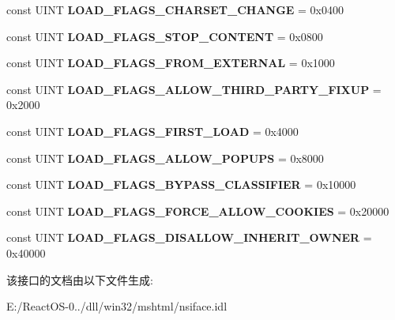 \begin{DoxyCompactItemize}
\item 
\mbox{\label{interfacens_i_web_navigation_abfb617c83b36cba556da0ed4e7e55145}} 
const U\+I\+NT {\bfseries L\+O\+A\+D\+\_\+\+F\+L\+A\+G\+S\+\_\+\+C\+H\+A\+R\+S\+E\+T\+\_\+\+C\+H\+A\+N\+GE} = 0x0400
\item 
\mbox{\label{interfacens_i_web_navigation_ab5475f69d242f1e0cf9540234a593072}} 
const U\+I\+NT {\bfseries L\+O\+A\+D\+\_\+\+F\+L\+A\+G\+S\+\_\+\+S\+T\+O\+P\+\_\+\+C\+O\+N\+T\+E\+NT} = 0x0800
\item 
\mbox{\label{interfacens_i_web_navigation_a9f9f064ebf3011fab6fd9fe8879386f6}} 
const U\+I\+NT {\bfseries L\+O\+A\+D\+\_\+\+F\+L\+A\+G\+S\+\_\+\+F\+R\+O\+M\+\_\+\+E\+X\+T\+E\+R\+N\+AL} = 0x1000
\item 
\mbox{\label{interfacens_i_web_navigation_a80cb7792f09cd9d40633d31f64d7ef5e}} 
const U\+I\+NT {\bfseries L\+O\+A\+D\+\_\+\+F\+L\+A\+G\+S\+\_\+\+A\+L\+L\+O\+W\+\_\+\+T\+H\+I\+R\+D\+\_\+\+P\+A\+R\+T\+Y\+\_\+\+F\+I\+X\+UP} = 0x2000
\item 
\mbox{\label{interfacens_i_web_navigation_a35d7cedd837a632adc4be44a3666a06a}} 
const U\+I\+NT {\bfseries L\+O\+A\+D\+\_\+\+F\+L\+A\+G\+S\+\_\+\+F\+I\+R\+S\+T\+\_\+\+L\+O\+AD} = 0x4000
\item 
\mbox{\label{interfacens_i_web_navigation_a6f89b841601276fe8bca84d3676fdc9f}} 
const U\+I\+NT {\bfseries L\+O\+A\+D\+\_\+\+F\+L\+A\+G\+S\+\_\+\+A\+L\+L\+O\+W\+\_\+\+P\+O\+P\+U\+PS} = 0x8000
\item 
\mbox{\label{interfacens_i_web_navigation_a85e77bb66caadea05878024824f9a371}} 
const U\+I\+NT {\bfseries L\+O\+A\+D\+\_\+\+F\+L\+A\+G\+S\+\_\+\+B\+Y\+P\+A\+S\+S\+\_\+\+C\+L\+A\+S\+S\+I\+F\+I\+ER} = 0x10000
\item 
\mbox{\label{interfacens_i_web_navigation_adfb36b5f377f9a2186fbc223ad7df9a9}} 
const U\+I\+NT {\bfseries L\+O\+A\+D\+\_\+\+F\+L\+A\+G\+S\+\_\+\+F\+O\+R\+C\+E\+\_\+\+A\+L\+L\+O\+W\+\_\+\+C\+O\+O\+K\+I\+ES} = 0x20000
\item 
\mbox{\label{interfacens_i_web_navigation_acee3039728efec79baedbc6eb2557090}} 
const U\+I\+NT {\bfseries L\+O\+A\+D\+\_\+\+F\+L\+A\+G\+S\+\_\+\+D\+I\+S\+A\+L\+L\+O\+W\+\_\+\+I\+N\+H\+E\+R\+I\+T\+\_\+\+O\+W\+N\+ER} = 0x40000
\end{DoxyCompactItemize}


该接口的文档由以下文件生成\+:\begin{DoxyCompactItemize}
\item 
E\+:/\+React\+O\+S-\/0../dll/win32/mshtml/nsiface.\+idl\end{DoxyCompactItemize}
